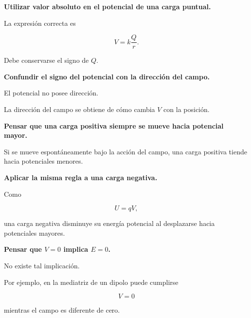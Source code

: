 \begin{errorfrecuente}

\textbf{Utilizar valor absoluto en el potencial de una carga puntual.}

La expresión correcta es

\[
V=k\frac{Q}{r}.
\]

Debe conservarse el signo de \(Q\).

\end{errorfrecuente}


\begin{errorfrecuente}

\textbf{Confundir el signo del potencial con la dirección del campo.}

El potencial no posee dirección.

La dirección del campo se obtiene de cómo cambia \(V\) con la posición.

\end{errorfrecuente}


\begin{errorfrecuente}

\textbf{Pensar que una carga positiva siempre se mueve hacia potencial mayor.}

Si se mueve espontáneamente bajo la acción del campo, una carga positiva tiende hacia
potenciales menores.

\end{errorfrecuente}


\begin{errorfrecuente}

\textbf{Aplicar la misma regla a una carga negativa.}

Como

\[
U=qV,
\]

una carga negativa disminuye su energía potencial al desplazarse hacia potenciales
mayores.

\end{errorfrecuente}


\begin{errorfrecuente}

\textbf{Pensar que \(V=0\) implica \(E=0\).}

No existe tal implicación.

Por ejemplo, en la mediatriz de un dipolo puede cumplirse

\[
V=0
\]

mientras el campo es diferente de cero.

\end{errorfrecuente}


